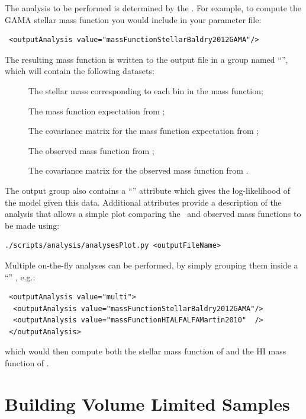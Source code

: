 The analysis to be performed is determined by the . For example, to compute the GAMA stellar mass function \citep{baldry_galaxy_2012} you would include in your parameter file:
\begin{verbatim}
 <outputAnalysis value="massFunctionStellarBaldry2012GAMA"/>
\end{verbatim}
The resulting mass function is written to the output file in a group named ``'', which will contain the following datasets:
\begin{description}
\item [] The stellar mass corresponding to each bin in the mass function;
\item [] The mass function expectation from \glc;
\item [] The covariance matrix for the mass function expectation from \glc;
\item [] The observed mass function from \cite{baldry_galaxy_2012};
\item [] The covariance matrix for the observed mass function from \cite{baldry_galaxy_2012}.
\end{description}
The output group also contains a ``'' attribute which gives the log-likelihood of the model given this data. Additional attributes provide a description of the analysis that allows a simple plot comparing the \glc\ and observed mass functions to be made using:
\begin{verbatim}
./scripts/analysis/analysesPlot.py <outputFileName>
\end{verbatim}

Multiple on-the-fly analyses can be performed, by simply grouping them inside a ``'' , e.g.:
\begin{verbatim}
 <outputAnalysis value="multi">
  <outputAnalysis value="massFunctionStellarBaldry2012GAMA"/>
  <outputAnalysis value="massFunctionHIALFALFAMartin2010"  />
 </outputAnalysis>
\end{verbatim}
which would then compute both the stellar mass function of \cite{baldry_galaxy_2012} and the HI mass function of \cite{martin_arecibo_2010}.

\section{Building Volume Limited Samples}\label{sec:volumeLimitedSamples}

